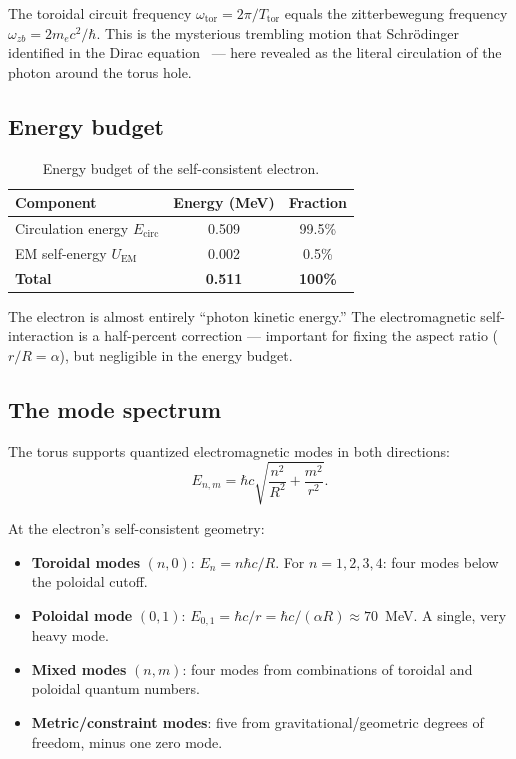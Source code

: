 \documentclass[11pt,a4paper]{article}
\begin{document}
The toroidal circuit frequency $\omega_{\text{tor}} = 2\pi/T_{\text{tor}}$ equals the zitterbewegung frequency $\omega_{zb} = 2m_e c^2/\hbar$. This is the mysterious trembling motion that Schr\"odinger identified in the Dirac equation~\cite{schrodinger1930} --- here revealed as the literal circulation of the photon around the torus hole.

\subsection{Energy budget}

\begin{table}[h]
\centering
\begin{tabular}{@{}lcc@{}}
\toprule
Component & Energy (MeV) & Fraction \\
\midrule
Circulation energy $E_{\text{circ}}$ & 0.509 & 99.5\% \\
EM self-energy $U_{\text{EM}}$ & 0.002 & 0.5\% \\
\midrule
\textbf{Total} & \textbf{0.511} & \textbf{100\%} \\
\bottomrule
\end{tabular}
\caption{Energy budget of the self-consistent electron.}
\label{tab:energy-budget2}
\end{table}

The electron is almost entirely ``photon kinetic energy.'' The electromagnetic self-interaction is a half-percent correction --- important for fixing the aspect ratio ($r/R = \alpha$), but negligible in the energy budget.

\subsection{The mode spectrum}

The torus supports quantized electromagnetic modes in both directions:
\begin{equation}
  E_{n,m} = \hbar c \sqrt{\frac{n^2}{R^2} + \frac{m^2}{r^2}}.
  \label{eq:mode-spectrum}
\end{equation}

At the electron's self-consistent geometry:
\begin{itemize}
  \item \textbf{Toroidal modes} $(n,0)$: $E_n = n\hbar c/R$. For $n = 1, 2, 3, 4$: four modes below the poloidal cutoff.
  \item \textbf{Poloidal mode} $(0,1)$: $E_{0,1} = \hbar c/r = \hbar c/(\alpha R) \approx 70$~MeV. A single, very heavy mode.
  \item \textbf{Mixed modes} $(n,m)$: four modes from combinations of toroidal and poloidal quantum numbers.
  \item \textbf{Metric/constraint modes}: five from gravitational/geometric degrees of freedom, minus one zero mode.
\end{itemize}
\end{document}
